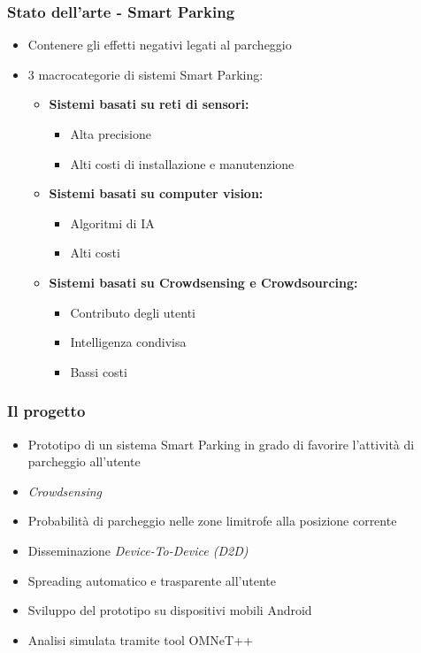 \documentclass{beamer}
\begin{document}
\begin{frame}
  \frametitle{Stato dell'arte - Smart Parking}
  \begin{itemize}

   \item Contenere gli effetti negativi legati al parcheggio
   \item 3 macrocategorie di sistemi Smart Parking: 

    \begin{itemize}
      \item \textbf{Sistemi basati su reti di sensori:}
      \begin{itemize}
	\item Alta precisione
	\item Alti costi di installazione e manutenzione
      \end{itemize}
      \item \textbf{Sistemi basati su computer vision:}
      \begin{itemize}
	\item Algoritmi di IA
	\item Alti costi
      \end{itemize}
      \item \textbf{Sistemi basati su Crowdsensing e Crowdsourcing:}
      \begin{itemize}
	\item Contributo degli utenti
	\item Intelligenza condivisa
	\item Bassi costi
      \end{itemize}
    \end{itemize}
  \end{itemize}
\end{frame}


\begin{frame}
  \frametitle{Il progetto}
  \begin{itemize}
    \item Prototipo di un sistema Smart Parking in grado di favorire l'attività di parcheggio all'utente 
    \item \textit{Crowdsensing}
    \item Probabilità di parcheggio nelle zone limitrofe alla posizione corrente
    \item Disseminazione \textit{Device-To-Device (D2D)}
    \item Spreading automatico e trasparente all'utente
    \item Sviluppo del prototipo su dispositivi mobili Android
    \item Analisi simulata tramite tool OMNeT++
  \end{itemize}
\end{frame}
\end{document}
